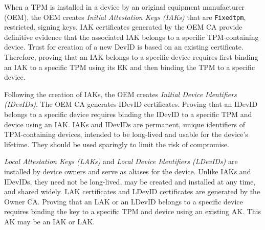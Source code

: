 \documentclass[runningheads]{llncs}
\begin{document}
When a TPM is installed in a device by an original equipment
manufacturer (OEM), the OEM creates \emph{Initial Attestation Keys
  (IAKs)} that are \verb|Fixedtpm|, restricted, signing keys. IAK
certificates generated by the OEM CA provide definitive evidence that
the associated IAK belongs to a specific TPM-containing device.  Trust
for creation of a new DevID is based on an existing certificate.
Therefore, proving that an IAK belongs to a specific device requires
first binding an IAK to a specific TPM using its EK and then binding
the TPM to a specific device.

Following the creation of IAKs, the OEM creates \emph{Initial Device
  Identifiers (IDevIDs)}. The OEM CA generates IDevID
certificates. Proving that an IDevID belongs to a specific device
requires binding the IDevID to a specific TPM and device using an IAK.
IAKs and IDevIDs are permanent, unique identifiers of TPM-containing
devices, intended to be long-lived and usable for the device's
lifetime.  They should be used sparingly to limit the risk of
compromise.


\emph{Local Attestation Keys (LAKs)} and 
\emph{Local Device Identifiers (LDevIDs)} are installed by device owners
and serve as aliases for the device. Unlike IAKs and IDevIDs, they
need not be long-lived, may be created and installed at any time, and
shared widely. LAK certificates and LDevID certificates are generated by
the Owner CA. Proving that an LAK or an LDevID belongs to a specific device 
requires binding the key to a specific TPM and device using an existing AK. 
This AK may be an IAK or LAK. 
\end{document}
